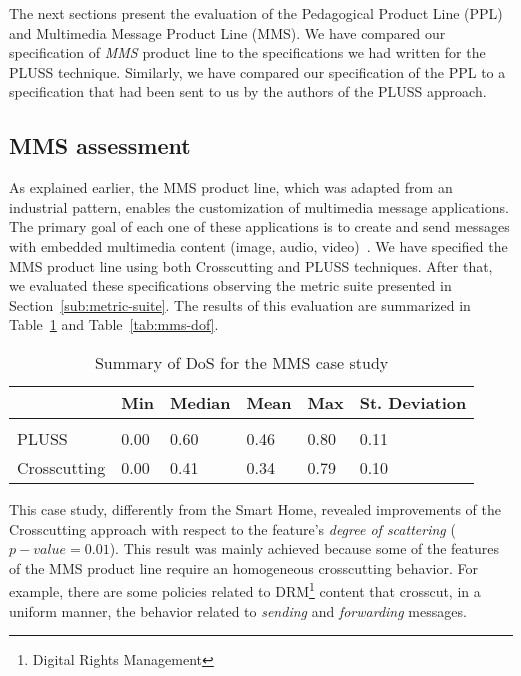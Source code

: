 The next sections present the evaluation of the Pedagogical Product Line (PPL)
and Multimedia Message Product Line (MMS). We have compared our specification of
\emph{MMS} product line to the specifications we had written for the
PLUSS technique. Similarly, we have compared our specification
of the PPL to a specification that had been sent to us by
the authors of the PLUSS approach.

\subsection{MMS assessment}

As explained earlier, the MMS product line, which was adapted from an industrial
pattern, enables the customization of multimedia message applications. The
primary goal of each one of these applications is to create and send messages
with embedded multimedia content (image, audio, video)~\cite{Bonifacio:2008aa}.
We have specified the MMS product line using both Crosscutting and PLUSS
techniques. After that, we evaluated these specifications observing the metric
suite presented in Section~\ref{sub:metric-suite}. The results of this evaluation are
summarized in Table~\ref{tab:mms-dos} and Table~\ref{tab:mms-dof}.

\begin{table}[htb] \centering
\caption{Summary of DoS for the MMS case study}
\label{tab:mms-dos}
\begin{small}
\begin{tabular}{llllll} \hline
					& Min 	& Median 	& Mean 	& Max 	& St. Deviation \\ \hline \\
	PLUSS			& 0.00  & 0.60   	& 0.46  & 0.80 	& 0.11 			\\
	Crosscutting	& 0.00  & 0.41   	& 0.34 	& 0.79 	& 0.10			\\ \hline	
\end{tabular}
\end{small}
\end{table}

This case study, differently from the Smart Home, revealed improvements of the
Crosscutting approach with respect to the feature's \emph{degree of scattering}
($p-value=0.01$). This result was mainly achieved because some of the features of
the MMS product line require an homogeneous crosscutting behavior. For example,
there are some policies related to DRM\footnote{Digital Rights Management}
content that crosscut, in a uniform manner, the behavior related to
\emph{sending} and \emph{forwarding} messages.

